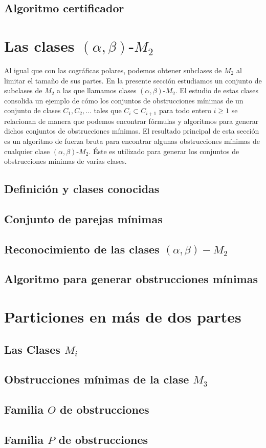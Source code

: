     \subsection{Algoritmo certificador}
        

\section{Las clases $(\alpha, \beta)$-$M_2$}

    Al igual que con las cográficas polares, podemos obtener subclases de $M_2$ al limitar el tamaño de sus partes. En la presente sección estudiamos un conjunto de subclases de $M_2$ a las que llamamos clases $(\alpha, \beta)$-$M_2$. El estudio de estas clases consolida un ejemplo de cómo los conjuntos de obstrucciones mínimas de un conjunto de clases $C_1,C_2, \dots$ tales que $C_i \subset C_{i+1}$ para todo entero $i \geq 1$ se relacionan de manera que podemos encontrar fórmulas y algoritmos para generar dichos conjuntos de obstrucciones mínimas. El resultado principal de esta sección es un algoritmo de fuerza bruta para encontrar algunas obstrucciones mínimas de cualquier clase $(\alpha, \beta)$-$M_2$. Éste es utilizado para generar los conjuntos de obstrucciones mínimas de varias clases.

    \subsection{Definición y clases conocidas}
        

    \subsection{Conjunto de parejas mínimas}
        

    \subsection{Reconocimiento de las clases $(\alpha, \beta)-M_2$}

    \subsection{Algoritmo para generar obstrucciones mínimas}

\section{Particiones en más de dos partes}
    \subsection{Las Clases $M_i$}

    \subsection{Obstrucciones mínimas de la clase $M_3$}
        

    \subsection{Familia $O$ de obstrucciones}

    \subsection{Familia $P$ de obstrucciones}
